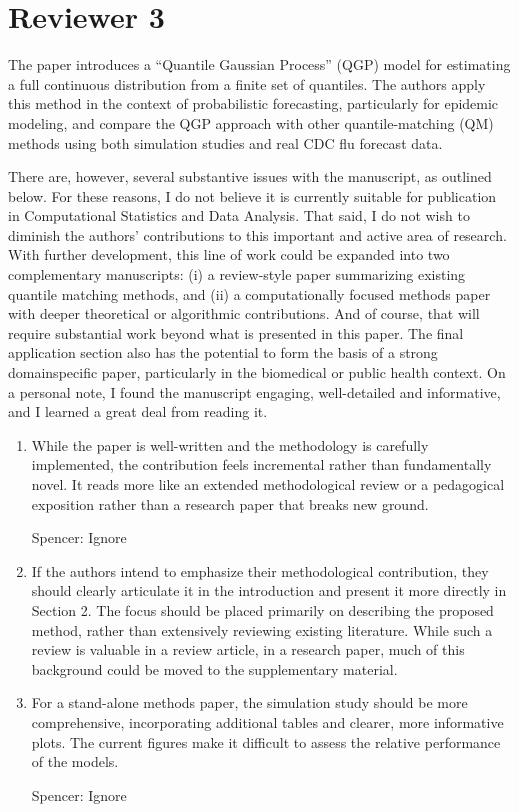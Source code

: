 \documentclass{article}
\newcommand{\spencer}[1]{{\color{blue} Spencer: #1}}
\begin{document}
\section*{Reviewer 3}

The paper introduces a “Quantile Gaussian Process” (QGP) model for estimating a 
full continuous distribution from a finite set of quantiles. The authors
apply this method in the context of probabilistic forecasting, particularly for
epidemic modeling, and compare the QGP approach with other quantile-matching
(QM) methods using both simulation studies and real CDC flu forecast data.

There are, however, several substantive issues with the manuscript, as outlined 
below. For these reasons, I do not believe it is currently suitable for
publication in Computational Statistics and Data Analysis. That said, I do not
wish to diminish the authors’ contributions to this important and active area
of research. With further development, this line of work could be expanded
into two complementary manuscripts: (i) a review-style paper summarizing 
existing quantile matching methods, and (ii) a computationally focused methods
paper with deeper theoretical or algorithmic contributions. And of course, that
will require substantial work beyond what is presented in this paper. The final
application section also has the potential to form the basis of a strong 
domainspecific paper, particularly in the biomedical or public health context. 
On a
personal note, I found the manuscript engaging, well-detailed and informative,
and I learned a great deal from reading it.

\begin{enumerate}[1]

  \item While the paper is well-written and the methodology is carefully 
  implemented, the contribution feels incremental rather than fundamentally
  novel. It reads more like an extended methodological review or a pedagogical 
  exposition rather than a research paper that breaks new ground.
  
  \spencer{Ignore}
  
  \item If the authors intend to emphasize their methodological contribution, 
  they
  should clearly articulate it in the introduction and present it more directly
  in Section 2. The focus should be placed primarily on describing the
  proposed method, rather than extensively reviewing existing literature.
  While such a review is valuable in a review article, in a research paper,
  much of this background could be moved to the supplementary material.
  
  \item For a stand-alone methods paper, the simulation study should be more
  comprehensive, incorporating additional tables and clearer, more informative 
  plots. The current figures make it difficult to assess the relative
  performance of the models.
  
  \spencer{Ignore}
  
\end{enumerate}  


  
\end{document}
